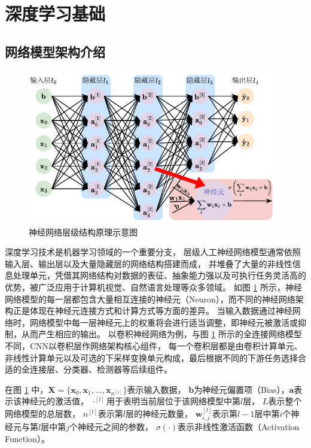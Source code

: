 \documentclass{xdupgthesis}
\begin{document}
\section{深度学习基础}
\subsection{网络模型架构介绍}
\begin{figure}[htb]
    \centering
    \includegraphics[width=0.98\textwidth]{神经网络结构.pdf}
    \caption{神经网络层级结构原理示意图}
    \label{fig_NetworkStruct}
\end{figure}

深度学习技术是机器学习领域的一个重要分支，
层级人工神经网络模型通常依照输入层、输出层以及大量隐藏层的网络结构搭建而成，
并堆叠了大量的非线性信息处理单元，凭借其网络结构对数据的表征、抽象能力强以及可执行任务灵活高的优势，被广泛应用于计算机视觉、自然语言处理等众多领域。
如图 \ref{fig_NetworkStruct} 所示，神经网络模型的每一层都包含大量相互连接的神经元（Neuron），而不同的神经网络架构正是体现在神经元连接方式和计算方式等方面的差异。
当输入数据通过神经网络时，网络模型中每一层神经元上的权重将会进行适当调整，即神经元被激活或抑制，从而产生相应的输出。
以卷积神经网络为例，与图 \ref{fig_NetworkStruct} 所示的全连接网络模型不同，CNN以卷积层作网络架构核心组件，
每一个卷积层都是由卷积计算单元、非线性计算单元以及可选的下采样变换单元构成，最后根据不同的下游任务选择合适的全连接层、分类器、检测器等后续组件。

在图 \ref{fig_NetworkStruct} 中，$\mathbf{X} = \{ \mathbf{x}_{0}, \mathbf{x}_{1}, ... , \mathbf{x}_{n^{[1]}} \}$表示输入数据，
$\mathbf{b}$为神经元偏置项（Bias），$\mathbf{a}$表示该神经元的激活值，
${\cdot}^{[l]}$用于表明当前层位于该网络模型中第$l$层，
$L$表示整个网络模型的总层数，
$n^{[l]}$表示第$l$层的神经元数量，
$\mathbf{w}_{i, j}^{[l]}$表示第$l-1$层中第$i$个神经元与第$l$层中第$j$个神经元之间的参数，
$\sigma(\cdot)$表示非线性激活函数（Activation Function）。
\end{document}
